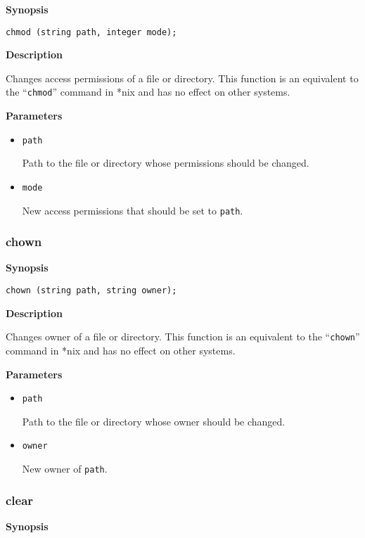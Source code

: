\documentclass[a4paper, 10pt, titlepage]{article}
\begin{document}
\textbf{Synopsis}

\begin{verbatim}
chmod (string path, integer mode);
\end{verbatim}

\textbf{Description}

Changes access permissions of a file or directory. This function is an equivalent to the ``\texttt{chmod}'' command in *nix and has no effect on other systems.

\textbf{Parameters}

\begin{itemize}
\item \texttt{path}

Path to the file or directory whose permissions should be changed.

\item \texttt{mode}

New access permissions that should be set to \texttt{path}.
\end{itemize}

\subsubsection{chown}

\textbf{Synopsis}

\begin{verbatim}
chown (string path, string owner);
\end{verbatim}

\textbf{Description}

Changes owner of a file or directory. This function is an equivalent to the ``\texttt{chown}'' command in *nix and has no effect on other systems.

\textbf{Parameters}

\begin{itemize}
\item \texttt{path}

Path to the file or directory whose owner should be changed.

\item \texttt{owner}

New owner of \texttt{path}.
\end{itemize}

\subsubsection{clear}

\textbf{Synopsis}
\end{document}

